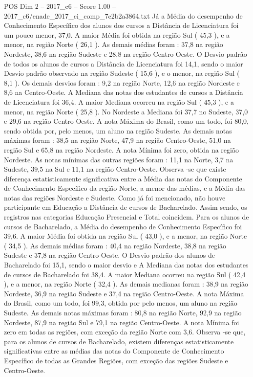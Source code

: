 \begin{textsample}{POS Dim 2 – 2017\_c6 – Score 1.00 – 2017\_c6/enade\_2017\_ci\_comp\_7c2b2a3864.txt}
Já a Média do desempenho de Conhecimento Específico dos alunos dos cursos a Distância de Licenciatura foi um pouco menor, 37,0.
A maior Média foi obtida na região Sul ( 45,3 ), e a menor, na região Norte ( 26,1 ).
As demais médias foram : 37,8 na região Nordeste, 38,6 na região Sudeste e 28,8 na região Centro-Oeste.
O Desvio padrão de todos os alunos de cursos a Distância de Licenciatura foi 14,1, sendo o maior Desvio padrão observado na região Sudeste ( 15,6 ), e o menor, na região Sul ( 8,1 ).
Os demais desvios foram : 9,2 na região Norte, 12,6 na região Nordeste e 8,6 na Centro-Oeste.
A Mediana das notas dos estudantes de cursos a Distância de Licenciatura foi 36,4.
A maior Mediana ocorreu na região Sul ( 45,3 ), e a menor, na região Norte ( 25,8 ).
No Nordeste a Mediana foi 37,7 no Sudeste, 37,0 e 29,6 na região Centro-Oeste.
A nota Máxima do Brasil, como um todo, foi 80,0, sendo obtida por, pelo menos, um aluno na região Sudeste.
As demais notas máximas foram : 38,5 na região Norte, 47,9 na região Centro-Oeste, 51,0 na região Sul e 65,8 na região Nordeste.
A nota Mínima foi zero, obtida na região Nordeste.
As notas mínimas das outras regiões foram : 11,1 na Norte, 3,7 na Sudeste, 39,5 na Sul e 11,1 na região Centro-Oeste.
Observa -se que existe diferença estatisticamente significativa entre a Média das notas do Componente de Conhecimento Específico da região Norte, a menor das médias, e a Média das notas das regiões Nordeste e Sudeste.
Como já foi mencionado, não houve participante em Educação a Distância de cursos de Bacharelado.
Assim sendo, os registros nas categorias Educação Presencial e Total coincidem.
Para os alunos de cursos de Bacharelado, a Média do desempenho de Conhecimento Específico foi 39,6.
A maior Média foi obtida na região Sul ( 43,0 ), e a menor, na região Norte ( 34,5 ).
As demais médias foram : 40,4 na região Nordeste, 38,8 na região Sudeste e 37,8 na região Centro-Oeste.
O Desvio padrão dos alunos de Bacharelado foi 15,1, sendo o maior desvio e A Mediana das notas dos estudantes de cursos de Bacharelado foi 38,4.
A maior Mediana ocorreu na região Sul ( 42,4 ), e a menor, na região Norte ( 32,4 ).
As demais medianas foram : 38,9 na região Nordeste, 36,9 na região Sudeste e 37,4 na região Centro-Oeste.
A nota Máxima do Brasil, como um todo, foi 99,3, obtida por pelo menos, um aluno na região Sudeste.
As demais notas máximas foram : 80,8 na região Norte, 92,9 na região Nordeste, 87,9 na região Sul e 79,1 na região Centro-Oeste.
A nota Mínima foi zero em todas as regiões, com exceção da região Norte com 3,6.
Observa -se que, para os alunos de cursos de Bacharelado, existem diferenças estatisticamente significativas entre as médias das notas do Componente de Conhecimento Específico de todas as Grandes Regiões, com exceção das regiões Sudeste e Centro-Oeste.

\end{textsample}
